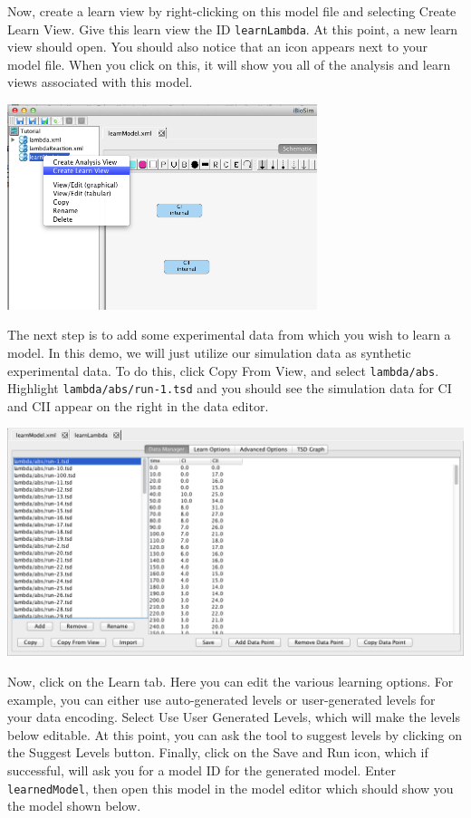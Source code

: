 \documentclass[titlepage,11pt]{article}
\begin{document}
Now, create a learn view by right-clicking on this model file and selecting Create Learn View.  Give this learn view the ID {\tt learnLambda}.  At this point, a new learn view should open.  You should also notice that an icon appears next to your model file.  When you click on this, it will show you all of the analysis and learn views associated with this model.

\begin{center}
\includegraphics[height=60mm]{screenshots/createLearn}
\end{center}

The next step is to add some experimental data from which you wish to learn a model.  In this demo, we will just utilize our simulation data as synthetic experimental data.  To do this, click Copy From View, and select {\tt lambda/abs}.  Highlight {\tt lambda/abs/run-1.tsd} and you should see the simulation data for CI and CII appear on the right in the data editor. 

\begin{center}
\includegraphics[width=160mm]{screenshots/dataManager}
\end{center}

Now, click on the Learn tab.  Here you can edit the various learning options.  For example, you can either use auto-generated levels or user-generated levels for your data encoding.  Select Use User Generated Levels, which will make the levels below editable.  At this point, you can ask the tool to suggest levels by clicking on the Suggest Levels button.  Finally, click on the Save and Run icon, which if successful, will ask you for a model ID for the generated model.  Enter {\tt learnedModel}, then open this model in the model editor which should show you the model shown below.
\end{document}
